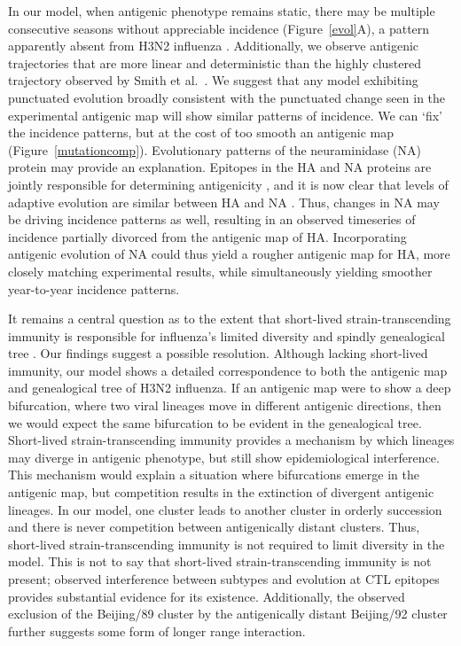 \documentclass[11pt,oneside,letterpaper]{article}
\begin{document}
In our model, when antigenic phenotype remains static, there may be multiple consecutive seasons without appreciable incidence (Figure~\ref{evol}A), a pattern apparently absent from H3N2 influenza \cite{Finkelman07}.  Additionally, we observe antigenic trajectories that are more linear and deterministic than the highly clustered trajectory observed by Smith et al.\ \cite{Smith04}.  We suggest that any model exhibiting punctuated evolution broadly consistent with the punctuated change seen in the experimental antigenic map will show similar patterns of incidence.  We can `fix' the incidence patterns, but at the cost of too smooth an antigenic map (Figure~\ref{mutationcomp}).  Evolutionary patterns of the neuraminidase (NA) protein may provide an explanation.  Epitopes in the HA and NA proteins are jointly responsible for determining antigenicity \cite{Nelson07NatRevGenet}, and it is now clear that levels of adaptive evolution are similar between HA and NA \cite{Bhatt11}.  Thus, changes in NA may be driving incidence patterns as well, resulting in an observed timeseries of incidence partially divorced from the antigenic map of HA.  Incorporating antigenic evolution of NA could thus yield a rougher antigenic map for HA, more closely matching experimental results, while simultaneously yielding smoother year-to-year incidence patterns.

It remains a central question as to the extent that short-lived strain-transcending immunity is responsible for influenza's limited diversity and spindly genealogical tree \cite{Ferguson03,Tria05}.  Our findings suggest a possible resolution.  Although lacking short-lived immunity, our model shows a detailed correspondence to both the antigenic map and genealogical tree of H3N2 influenza.  If an antigenic map were to show a deep bifurcation, where two viral lineages move in different antigenic directions, then we would expect the same bifurcation to be evident in the genealogical tree.  Short-lived strain-transcending immunity provides a mechanism by which lineages may diverge in antigenic phenotype, but still show epidemiological interference.  This mechanism would explain a situation where bifurcations emerge in the antigenic map, but competition results in the extinction of divergent antigenic lineages.  In our model, one cluster leads to another cluster in orderly succession and there is never competition between antigenically distant clusters.  Thus, short-lived strain-transcending immunity is not required to limit diversity in the model.  This is not to say that short-lived strain-transcending immunity is not present; observed interference between subtypes \cite{Ferguson03,Goldstein11} and evolution at CTL epitopes \cite{Voeten00} provides substantial evidence for its existence.  Additionally, the observed exclusion of the Beijing/89 cluster by the antigenically distant Beijing/92 cluster \cite{Smith04} further suggests some form of longer range interaction.
\end{document}
